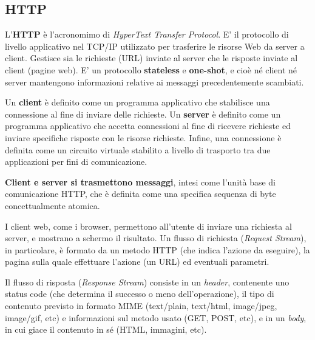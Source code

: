     \subsection{HTTP}
    
        L'\textbf{HTTP} è l'acronomimo di \textit{HyperText Transfer Protocol}. E' il protocollo di livello applicativo nel TCP/IP utilizzato per trasferire le risorse Web da server a client. Gestisce sia le richieste (URL) inviate al server che le risposte inviate al client (pagine web). E' un protocollo \textbf{stateless} e \textbf{one-shot}, e cioè né client né server mantengono informazioni relative ai messaggi precedentemente scambiati.
        
        \vspace{3mm}
        
        Un \textbf{client} è definito come un programma applicativo che stabilisce una connessione al fine di inviare delle richieste.
        Un \textbf{server} è definito come un programma applicativo che accetta connessioni al fine di ricevere richieste ed inviare specifiche risposte con le risorse richieste.
        Infine, una connessione è definita come un circuito virtuale stabilito a livello di trasporto tra due applicazioni per fini di comunicazione.
        
        \vspace{3mm}
        
        \textbf{Client e server si trasmettono messaggi}, intesi come l’unità base di comunicazione HTTP, che è definita come una specifica sequenza di byte concettualmente atomica.
        
        \vspace{3mm}
        
        I client web, come i browser, permettono all'utente di inviare una richiesta al server, e mostrano a schermo il risultato. Un flusso di richiesta (\textit{Request Stream}), in particolare, è formato da un metodo HTTP (che indica l'azione da eseguire), la pagina sulla quale effettuare l'azione (un URL) ed eventuali parametri.
        
        \vspace{3mm}
        
        Il flusso di risposta (\textit{Response Stream}) consiste in un \textit{header}, contenente uno status code (che determina il successo o meno dell'operazione), il tipo di contenuto previsto in formato MIME (text/plain, text/html, image/jpeg, image/gif, etc) e informazioni sul metodo usato (GET, POST, etc), e in un \textit{body}, in cui giace il contenuto in sé (HTML, immagini, etc).
        
